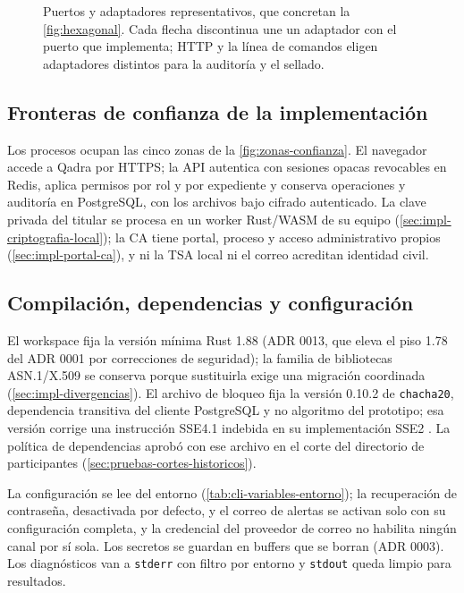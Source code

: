\begin{figure}[!htbp]
  \centering
  
  \caption{Puertos y adaptadores representativos, que concretan la \cref{fig:hexagonal}. Cada flecha discontinua une un adaptador con el puerto que implementa; HTTP y la línea de comandos eligen adaptadores distintos para la auditoría y el sellado.}
  \label{fig:hexagonal-completa}
\end{figure}

\subsection{Fronteras de confianza de la implementación}\label{sec:fronteras-confianza}\label{fig:fronteras-confianza}

Los procesos ocupan las cinco zonas de la \cref{fig:zonas-confianza}. El navegador accede a Qadra por HTTPS; la API autentica con sesiones opacas revocables en Redis, aplica permisos por rol y por expediente y conserva operaciones y auditoría en PostgreSQL, con los archivos bajo cifrado autenticado. La clave privada del titular se procesa en un worker Rust/WASM de su equipo (\cref{sec:impl-criptografia-local}); la CA tiene portal, proceso y acceso administrativo propios (\cref{sec:impl-portal-ca}), y ni la TSA local ni el correo acreditan identidad civil.

\subsection{Compilación, dependencias y configuración}\label{sec:impl-config}\label{tab:impl-env}

El workspace fija la versión mínima Rust 1.88 (ADR 0013, que eleva el piso 1.78 del ADR 0001 por correcciones de seguridad); la familia de bibliotecas ASN.1/X.509 se conserva porque sustituirla exige una migración coordinada (\cref{sec:impl-divergencias}). El archivo de bloqueo fija la versión 0.10.2 de \texttt{chacha20}, dependencia transitiva del cliente PostgreSQL y no algoritmo del prototipo; esa versión corrige una instrucción SSE4.1 indebida en su implementación SSE2 \cite{rustcrypto_chacha2026}. La política de dependencias aprobó con ese archivo en el corte del directorio de participantes (\cref{sec:pruebas-cortes-historicos}).

La configuración se lee del entorno (\cref{tab:cli-variables-entorno}); la recuperación de contraseña, desactivada por defecto, y el correo de alertas se activan solo con su configuración completa, y la credencial del proveedor de correo no habilita ningún canal por sí sola. Los secretos se guardan en buffers que se borran (ADR 0003). Los diagnósticos van a \texttt{stderr} con filtro por entorno y \texttt{stdout} queda limpio para resultados.

